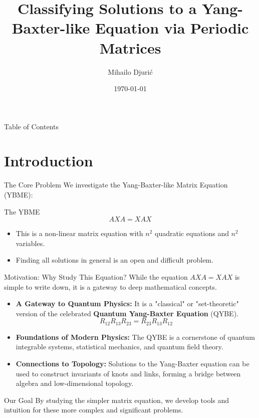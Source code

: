 \documentclass{beamer}
\title[Classifying Solutions to a Yang-Baxter-like Equation via Periodic Matrices]{Classifying Solutions to a Yang-Baxter-like Equation via Periodic Matrices}
\author{Mihailo Djurić}
\institute{Mathematical Institute SANU}
\date{\today}
\begin{document}
\begin{frame}
  \titlepage
\end{frame}

\begin{frame}{Table of Contents}
  \tableofcontents
\end{frame}

\section{Introduction}

\begin{frame}{The Core Problem}
  We investigate the Yang-Baxter-like Matrix Equation (YBME):
  \begin{block}{The YBME}
  \[ AXA = XAX \]
  \end{block}
  \begin{itemize}
    \item This is a non-linear matrix equation with $n^2$ quadratic equations and $n^2$ variables.
    \item Finding all solutions in general is an open and difficult problem.
  \end{itemize}
\end{frame}

\begin{frame}{Motivation: Why Study This Equation?}
  While the equation $AXA=XAX$ is simple to write down, it is a gateway to deep mathematical concepts.
  \vfill
  \begin{itemize}
    \item \textbf{A Gateway to Quantum Physics:} It is a "classical" or "set-theoretic" version of the celebrated \textbf{Quantum Yang-Baxter Equation} (QYBE).
    \[ R_{12} R_{13} R_{23} = R_{23} R_{13} R_{12} \]
    \item \textbf{Foundations of Modern Physics:} The QYBE is a cornerstone of quantum integrable systems, statistical mechanics, and quantum field theory.
    \vfill
    \item \textbf{Connections to Topology:} Solutions to the Yang-Baxter equation can be used to construct invariants of knots and links, forming a bridge between algebra and low-dimensional topology.
  \end{itemize}
  \vfill
  \begin{alertblock}{Our Goal}
  By studying the simpler matrix equation, we develop tools and intuition for these more complex and significant problems.
  \end{alertblock}
\end{frame}
\end{document}
